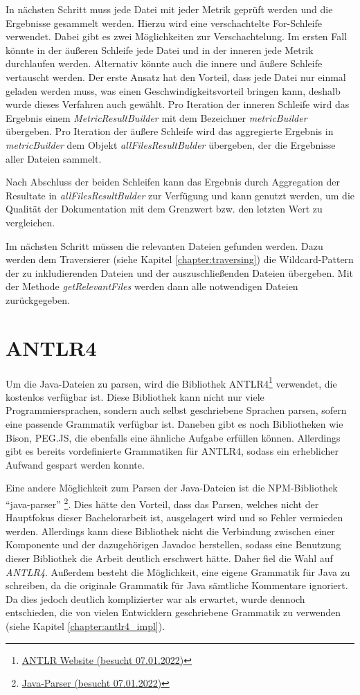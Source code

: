 In nächsten Schritt muss jede Datei mit jeder Metrik geprüft werden und die Ergebnisse gesammelt werden. Hierzu wird eine verschachtelte For-Schleife verwendet. Dabei gibt es zwei Möglichkeiten zur Verschachtelung. Im ersten Fall könnte in der äußeren Schleife jede Datei und in der inneren jede Metrik durchlaufen werden. Alternativ könnte auch die innere und äußere Schleife vertauscht werden. Der erste Ansatz hat den Vorteil, dass jede Datei nur einmal geladen werden muss, was einen Geschwindigkeitsvorteil bringen kann, deshalb wurde dieses Verfahren auch gewählt. Pro Iteration der inneren Schleife  wird das Ergebnis einem \textit{MetricResultBuilder} mit dem Bezeichner \textit{metricBuilder}  übergeben. Pro Iteration der äußere Schleife wird das aggregierte Ergebnis in \textit{metricBuilder} dem Objekt \textit{allFilesResultBulder} übergeben, der die Ergebnisse aller Dateien sammelt. 

Nach Abschluss der beiden Schleifen kann das Ergebnis durch Aggregation der Resultate in \textit{allFilesResultBulder} zur Verfügung und kann genutzt werden, um die Qualität der Dokumentation mit dem Grenzwert bzw. den letzten Wert zu vergleichen. 

Im nächsten Schritt müssen die relevanten Dateien gefunden werden. Dazu werden dem Traversierer (siehe Kapitel \ref{chapter:traversing}) die Wildcard-Pattern der zu inkludierenden Dateien und der auszuschließenden Dateien übergeben. Mit der Methode \textit{getRelevantFiles} werden dann alle notwendigen Dateien zurückgegeben.
\section{ANTLR4}
Um die Java-Dateien zu parsen, wird die Bibliothek ANTLR4\footnote{\href{https://www.antlr.org/}{ANTLR Website (besucht 07.01.2022)}} verwendet, die kostenlos verfügbar ist. Diese Bibliothek kann nicht nur viele Programmiersprachen, sondern auch selbst geschriebene Sprachen parsen, sofern eine passende Grammatik verfügbar ist. Daneben gibt es noch Bibliotheken wie Bison, PEG.JS, die ebenfalls eine ähnliche Aufgabe erfüllen können. Allerdings gibt es bereits vordefinierte Grammatiken für ANTLR4, sodass ein erheblicher Aufwand gespart werden konnte.  

Eine andere Möglichkeit zum Parsen der Java-Dateien ist die NPM-Bibliothek \enquote{java-parser} \footnote{\href{https://www.npmjs.com/package/java-parser}{Java-Parser (besucht 07.01.2022)}}. Dies hätte den Vorteil, dass das Parsen, welches nicht der Hauptfokus dieser Bachelorarbeit ist, ausgelagert wird und so Fehler vermieden werden. Allerdings kann diese Bibliothek nicht die Verbindung zwischen einer Komponente und der dazugehörigen Javadoc herstellen, sodass eine Benutzung dieser Bibliothek die Arbeit deutlich erschwert hätte. Daher fiel die Wahl auf \textit{ANTLR4}. Außerdem besteht die Möglichkeit, eine eigene Grammatik für Java zu schreiben, da die originale Grammatik für Java sämtliche Kommentare ignoriert. Da dies jedoch deutlich komplizierter war als erwartet, wurde dennoch entschieden, die von vielen Entwicklern geschriebene Grammatik zu verwenden (siehe Kapitel \ref{chapter:antlr4_impl}).

